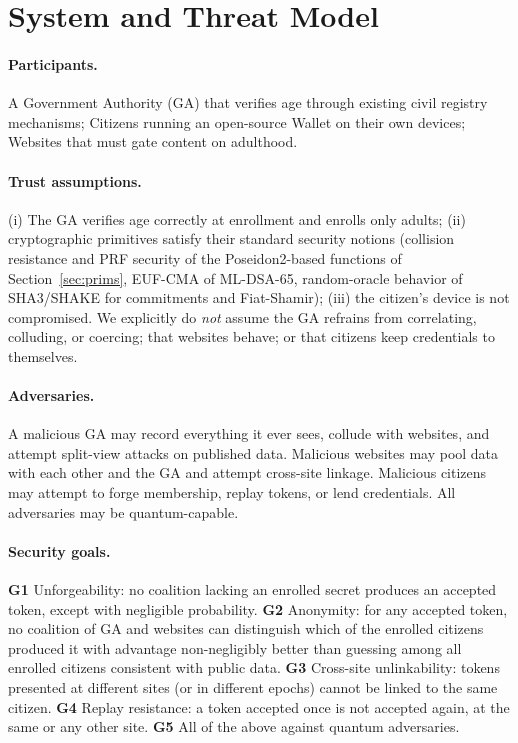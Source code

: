 \documentclass[11pt]{article}
\theoremstyle{definition}
\begin{document}
\section{System and Threat Model}
\label{sec:model}

\paragraph{Participants.} A Government Authority (GA) that verifies age through existing
civil registry mechanisms; Citizens running an open-source Wallet on their own devices;
Websites that must gate content on adulthood.

\paragraph{Trust assumptions.} (i) The GA verifies age correctly at enrollment and enrolls
only adults; (ii) cryptographic primitives satisfy their standard security notions
(collision resistance and PRF security of the Poseidon2-based functions of
Section~\ref{sec:prims}, EUF-CMA of ML-DSA-65, random-oracle behavior of SHA3/SHAKE
\cite{bellrog} for commitments and Fiat-Shamir); (iii) the citizen's device is not
compromised. We explicitly do \emph{not} assume the GA refrains from correlating,
colluding, or coercing; that websites behave; or that citizens keep credentials to
themselves.

\paragraph{Adversaries.} A malicious GA may record everything it ever sees, collude with
websites, and attempt split-view attacks on published data. Malicious websites may pool
data with each other and the GA and attempt cross-site linkage. Malicious citizens may
attempt to forge membership, replay tokens, or lend credentials. All adversaries may be
quantum-capable.

\paragraph{Security goals.}
\textbf{G1} Unforgeability: no coalition lacking an enrolled secret produces an accepted
token, except with negligible probability.
\textbf{G2} Anonymity: for any accepted token, no coalition of GA and websites can
distinguish which of the enrolled citizens produced it with advantage non-negligibly
better than guessing among all enrolled citizens consistent with public data.
\textbf{G3} Cross-site unlinkability: tokens presented at different sites (or in different
epochs) cannot be linked to the same citizen.
\textbf{G4} Replay resistance: a token accepted once is not accepted again, at the same or
any other site.
\textbf{G5} All of the above against quantum adversaries.
\end{document}
